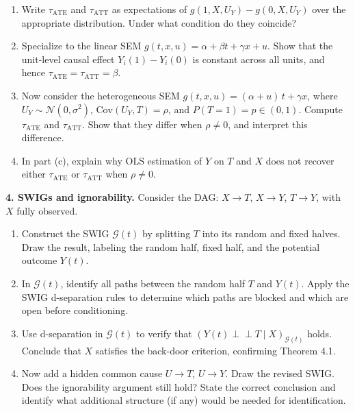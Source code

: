 \documentclass[
  a4paper,
]{book}
\providecommand{\tightlist}{%
  \setlength{\itemsep}{0pt}\setlength{\parskip}{0pt}}
\newcommand{\indep}{\perp\!\!\!\perp}
\newcommand{\Gcal}{\mathcal{G}}
\begin{document}
\begin{enumerate}
\def\labelenumi{(\alph{enumi})}
\tightlist
\item
  Write \(\tau_{\mathrm{ATE}}\) and \(\tau_{\mathrm{ATT}}\) as
  expectations of \(g(1, X, U_Y) - g(0, X, U_Y)\) over the appropriate
  distribution. Under what condition do they coincide?
\item
  Specialize to the linear SEM
  \(g(t, x, u) = \alpha + \beta t + \gamma x + u\). Show that the
  unit-level causal effect \(Y_i(1) - Y_i(0)\) is constant across all
  units, and hence
  \(\tau_{\mathrm{ATE}} = \tau_{\mathrm{ATT}} = \beta\).
\item
  Now consider the heterogeneous SEM
  \(g(t, x, u) = (\alpha + u)\,t + \gamma x\), where
  \(U_Y \sim \mathcal{N}(0, \sigma^2)\),
  \(\mathrm{Cov}(U_Y, T) = \rho\), and \(P(T{=}1) = p \in (0,1)\).
  Compute \(\tau_{\mathrm{ATE}}\) and \(\tau_{\mathrm{ATT}}\). Show that
  they differ when \(\rho \neq 0\), and interpret this difference.
\item
  In part (c), explain why OLS estimation of \(Y\) on \(T\) and \(X\)
  does not recover either \(\tau_{\mathrm{ATE}}\) or
  \(\tau_{\mathrm{ATT}}\) when \(\rho \neq 0\).
\end{enumerate}

\textbf{4. SWIGs and ignorability.} Consider the DAG: \(X \to T\),
\(X \to Y\), \(T \to Y\), with \(X\) fully observed.

\begin{enumerate}
\def\labelenumi{(\alph{enumi})}
\tightlist
\item
  Construct the SWIG \(\Gcal(t)\) by splitting \(T\) into its random and
  fixed halves. Draw the result, labeling the random half, fixed half,
  and the potential outcome \(Y(t)\).
\item
  In \(\Gcal(t)\), identify all paths between the random half \(T\) and
  \(Y(t)\). Apply the SWIG d-separation rules to determine which paths
  are blocked and which are open before conditioning.
\item
  Use d-separation in \(\Gcal(t)\) to verify that
  \((Y(t) \indep T \mid X)_{\Gcal(t)}\) holds. Conclude that \(X\)
  satisfies the back-door criterion, confirming Theorem 4.1.
\item
  Now add a hidden common cause \(U \to T\), \(U \to Y\). Draw the
  revised SWIG. Does the ignorability argument still hold? State the
  correct conclusion and identify what additional structure (if any)
  would be needed for identification.
\end{enumerate}
\end{document}
